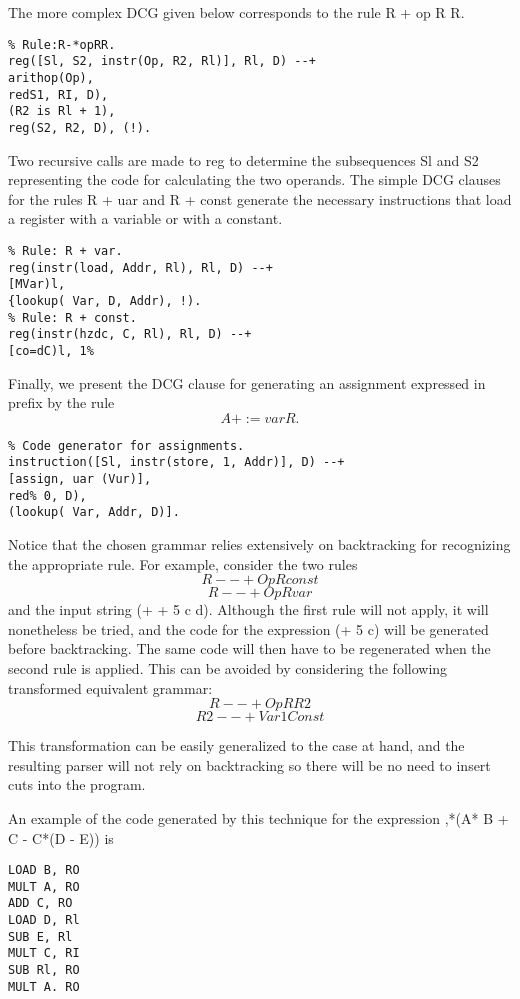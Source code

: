 The more complex DCG given below corresponds to the rule R + op R R.
\begin{verbatim}
% Rule:R-*opRR.
reg([Sl, S2, instr(Op, R2, Rl)], Rl, D) --+
arithop(Op),
redS1, RI, D),
(R2 is Rl + 1),
reg(S2, R2, D), (!). 
\end{verbatim}

Two recursive calls are made to reg to determine the subsequences Sl and S2
representing the code for calculating the two operands. The simple DCG clauses
for the rules R + uar and R + const generate the necessary instructions that
load a register with a variable or with a constant.
\begin{verbatim}
% Rule: R + var.
reg(instr(load, Addr, Rl), Rl, D) --+
[MVar)l,
{lookup( Var, D, Addr), !).
% Rule: R + const.
reg(instr(hzdc, C, Rl), Rl, D) --+
[co=dC)l, 1% 
\end{verbatim}

Finally, we present the DCG clause for generating an assignment expressed in
prefix by the rule
\[A + := var R.\]
\begin{verbatim}
% Code generator for assignments.
instruction([Sl, instr(store, 1, Addr)], D) --+
[assign, uar (Vur)],
red% 0, D),
(lookup( Var, Addr, D)]. 
\end{verbatim}

Notice that the chosen grammar relies extensively on backtracking for recognizing
the appropriate rule. For example, consider the two rules
\[R --+ Op R const\]
\[R --+ Op R var\]
and the input string (+ + 5 c d). Although the first rule will not apply, it will
nonetheless be tried, and the code for the expression (+ 5 c) will be generated
before backtracking. The same code will then have to be regenerated when the
second rule is applied. This can be avoided by considering the following transformed
equivalent grammar:
\[R --+ Op R R2\]
\[R2 --+ Var 1 Const\]

This transformation can be easily generalized to the case at hand, and the
resulting parser will not rely on backtracking so there will be no need to insert
cuts into the program. 

An example of the code generated by this technique for the expression
,*(A* B + C - C*(D - E)) is
\begin{verbatim}
LOAD B, RO
MULT A, RO
ADD C, RO
LOAD D, Rl
SUB E, Rl
MULT C, RI
SUB Rl, RO
MULT A. RO  
\end{verbatim}
   
\secup